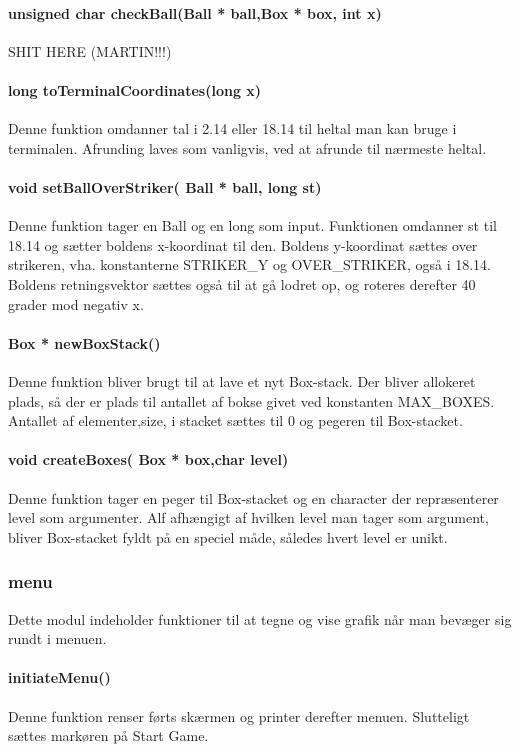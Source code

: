 \paragraph{unsigned char checkBall(Ball * ball,Box * box,  int x)}
SHIT HERE (MARTIN!!!)
\paragraph{long toTerminalCoordinates(long x)}
Denne funktion omdanner tal i 2.14 eller 18.14 til heltal man kan bruge i terminalen. Afrunding laves som vanligvis, ved at afrunde til nærmeste heltal.

\paragraph{void setBallOverStriker( Ball * ball, long st)}
Denne funktion tager en Ball og en long som input.
Funktionen omdanner st til 18.14 og sætter boldens x-koordinat til den.
Boldens y-koordinat sættes over strikeren, vha. konstanterne STRIKER\_Y og OVER\_STRIKER, også i 18.14. Boldens retningsvektor sættes også til at gå lodret op, og roteres derefter 40 grader mod negativ x.
\paragraph{Box * newBoxStack()}
Denne funktion bliver brugt til at lave et nyt Box-stack. Der bliver allokeret plads, så der er plads til antallet af bokse givet ved konstanten MAX\_BOXES. Antallet af elementer,size, i stacket sættes til 0 og  pegeren til Box-stacket.
\paragraph{
void createBoxes( Box * box,char level)}
Denne funktion tager en peger til Box-stacket og en character der repræsenterer level som argumenter. Alf afhængigt af hvilken level man tager som argument, bliver Box-stacket fyldt på en speciel måde, således hvert level er unikt. 

\subsubsection{menu}
Dette modul indeholder funktioner til at tegne og vise grafik når man bevæger sig rundt i menuen.
\paragraph{initiateMenu()}
Denne funktion renser førts skærmen og printer derefter menuen. Slutteligt sættes markøren på Start Game.
